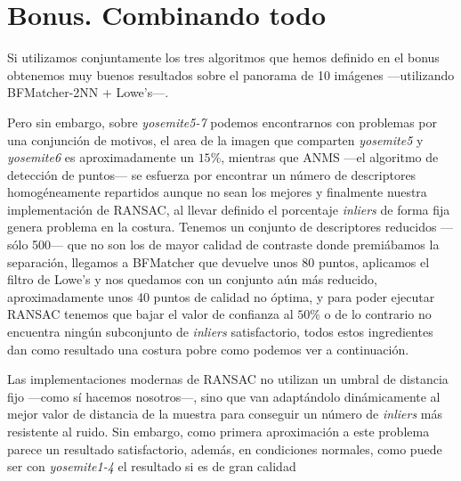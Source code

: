 \documentclass{article}
\newcommand{\img}[2]{
\noindent\makebox[\textwidth][c]{\texttt{[image: \#1]}}%
}
\begin{document}
\section{Bonus. Combinando todo}

Si utilizamos conjuntamente los tres algoritmos que hemos definido en el bonus obtenemos muy buenos resultados sobre el panorama de 10 imágenes ---utilizando BFMatcher-2NN + Lowe's---.

\img{img/bfinal_1}{1}

Pero sin embargo, sobre \textit{yosemite5-7} podemos encontrarnos con problemas por una conjunción de motivos, el area de la imagen que comparten \textit{yosemite5} y \textit{yosemite6} es aproximadamente un $15\%$, mientras que ANMS ---el algoritmo de detección de puntos--- se esfuerza por encontrar un número de descriptores homogéneamente repartidos aunque no sean los mejores y finalmente nuestra implementación de RANSAC, al llevar definido el porcentaje \textit{inliers} de forma fija genera problema en la costura. Tenemos un conjunto de descriptores reducidos ---sólo 500--- que no son los de mayor calidad de contraste donde premiábamos la separación, llegamos a BFMatcher que devuelve unos 80 puntos, aplicamos el filtro de Lowe's y nos quedamos con un conjunto aún más reducido, aproximadamente unos 40 puntos de calidad no óptima, y para poder ejecutar RANSAC tenemos que bajar el valor de confianza al $50\%$ o de lo contrario no encuentra ningún subconjunto de \textit{inliers} satisfactorio, todos estos ingredientes dan como resultado una costura pobre como podemos ver a continuación.

\img{img/bfinal_2}{1}

Las implementaciones modernas de RANSAC no utilizan un umbral de distancia fijo ---como sí hacemos nosotros---, sino que van adaptándolo dinámicamente al mejor valor de distancia de la muestra para conseguir un número de \textit{inliers} más resistente al ruido. Sin embargo, como primera aproximación a este problema parece un resultado satisfactorio, además, en condiciones normales, como puede ser con \textit{yosemite1-4} el resultado si es de gran calidad

\img{img/bfinal_3}{1}
\end{document}
